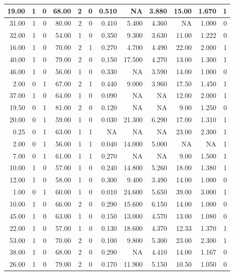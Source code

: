 \documentclass[
]{article}
\begin{document}
\begin{table}
\begin{tabular}[t]{r|r|r|r|r|r|r|r|r|r|r|r}
\hline
19.00 & 1 & 0 & 68.00 & 2 & 0 & 0.510 & NA & 3.880 & 15.00 & 1.670 & 1\\
\hline
31.00 & 1 & 0 & 80.00 & 2 & 0 & 0.410 & 5.400 & 4.360 & NA & 1.000 & 0\\
\hline
32.00 & 1 & 0 & 54.00 & 1 & 0 & 0.350 & 9.300 & 3.630 & 11.00 & 1.222 & 0\\
\hline
16.00 & 1 & 0 & 70.00 & 2 & 1 & 0.270 & 4.700 & 4.490 & 22.00 & 2.000 & 1\\
\hline
40.00 & 1 & 0 & 79.00 & 2 & 0 & 0.150 & 17.500 & 4.270 & 13.00 & 1.300 & 1\\
\hline
46.00 & 1 & 0 & 56.00 & 1 & 0 & 0.330 & NA & 3.590 & 14.00 & 1.000 & 0\\
\hline
2.00 & 0 & 1 & 67.00 & 2 & 1 & 0.440 & 9.000 & 3.960 & 17.50 & 1.450 & 1\\
\hline
37.00 & 1 & 0 & 64.00 & 1 & 0 & 0.090 & NA & NA & 12.00 & 2.000 & 1\\
\hline
19.50 & 0 & 1 & 81.00 & 2 & 0 & 0.120 & NA & NA & 9.00 & 1.250 & 0\\
\hline
20.00 & 0 & 1 & 59.00 & 1 & 0 & 0.030 & 21.300 & 6.290 & 17.00 & 1.310 & 1\\
\hline
0.25 & 0 & 1 & 63.00 & 1 & 1 & NA & NA & NA & 23.00 & 2.300 & 1\\
\hline
2.00 & 0 & 1 & 56.00 & 1 & 1 & 0.040 & 14.000 & 5.000 & NA & NA & 1\\
\hline
7.00 & 0 & 1 & 61.00 & 1 & 1 & 0.270 & NA & NA & 9.00 & 1.500 & 1\\
\hline
10.00 & 1 & 0 & 57.00 & 1 & 0 & 0.240 & 14.800 & 5.260 & 18.00 & 1.380 & 1\\
\hline
12.00 & 1 & 0 & 58.00 & 1 & 0 & 0.300 & 9.400 & 3.490 & 14.00 & 1.000 & 0\\
\hline
1.00 & 0 & 1 & 60.00 & 1 & 0 & 0.010 & 24.600 & 5.650 & 39.00 & 3.000 & 1\\
\hline
10.00 & 1 & 0 & 66.00 & 2 & 0 & 0.290 & 15.600 & 6.150 & 14.00 & 1.000 & 0\\
\hline
45.00 & 1 & 0 & 63.00 & 1 & 0 & 0.150 & 13.000 & 4.570 & 13.00 & 1.080 & 0\\
\hline
22.00 & 1 & 0 & 57.00 & 1 & 0 & 0.130 & 18.600 & 4.370 & 12.33 & 1.370 & 1\\
\hline
53.00 & 1 & 0 & 70.00 & 2 & 0 & 0.100 & 9.800 & 5.300 & 23.00 & 2.300 & 1\\
\hline
38.00 & 1 & 0 & 68.00 & 2 & 0 & 0.290 & NA & 4.410 & 14.00 & 1.167 & 0\\
\hline
26.00 & 1 & 0 & 79.00 & 2 & 0 & 0.170 & 11.900 & 5.150 & 10.50 & 1.050 & 0\\

\end{tabular}
\end{table}
\end{document}
